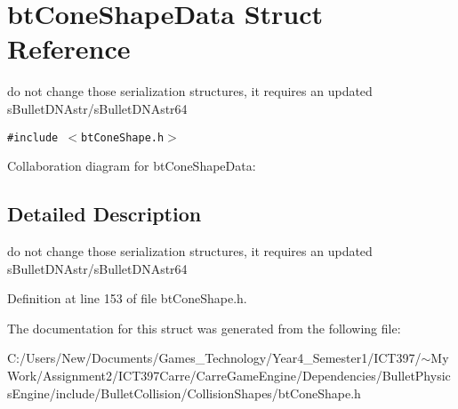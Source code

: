 \hypertarget{structbt_cone_shape_data}{
\section{btConeShapeData Struct Reference}
\label{structbt_cone_shape_data}
}
do not change those serialization structures, it requires an updated sBulletDNAstr/sBulletDNAstr64  


{\tt \#include $<$btConeShape.h$>$}

Collaboration diagram for btConeShapeData:

\subsection{Detailed Description}
do not change those serialization structures, it requires an updated sBulletDNAstr/sBulletDNAstr64 

Definition at line 153 of file btConeShape.h.

The documentation for this struct was generated from the following file:\begin{CompactItemize}
\item 
C:/Users/New/Documents/Games\_\-Technology/Year4\_\-Semester1/ICT397/$\sim$My Work/Assignment2/ICT397Carre/CarreGameEngine/Dependencies/BulletPhysicsEngine/include/BulletCollision/CollisionShapes/btConeShape.h\end{CompactItemize}
